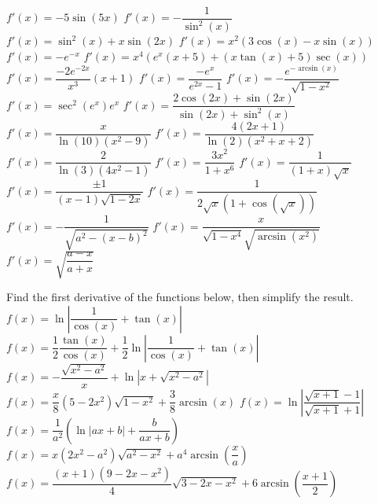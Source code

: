 \begin{Answer}\phantom{}
    \begin{multicols}{2}
	
			\ifcalculus\Question $f'(x) = -5\sin(5x)$
			\Question $f'(x) = -\dfrac{1}{\sin^2(x)}$\fi
			\Question $f'(x) =\sin^2 (x) + x\sin (2x) $
			\Question $f'(x) =x^2(3 \cos(x) - x \sin(x)) $
			\ifcalculus \Question $f'(x) = -e^{-x}$ \fi
	        \Question $f'(x)= x^4 \left(e^x \left(x+5 \right) + \left( x \tan(x) + 5 \right) \sec(x)  \right) $
        	\Question $f'(x)=\dfrac{-2e^{-2x}}{x^3}(x+1)$
            \Question $f'(x)=\dfrac{-e^{x}}{e^{2x}-1} $
        	\Question $f'(x) = -\dfrac{e^{- \arcsin (x)}}{\sqrt{1-x^2}}$
        	\Question $f'(x) = \sec^2 (e^x)e^x$
        	\ifcalculus \Question $f'(x) = \dfrac{2\cos(2x)+\sin(2x)}{\sin(2x) + \sin^2(x)}$ \fi
        	\Question $f'(x) = \dfrac{x}{\ln (10) \left(x^2-9\right)}$
        	\Question $f'(x) = \dfrac{4(2x+1)}{\ln (2) \left(x^2+x+2\right)}$
        	\Question $f'(x) = \dfrac{2}{\ln (3) \left(4x^2-1\right)}$
        	\ifcalculus \Question $f'(x) = \dfrac{3x^2}{1+x^6}$ 
	        \Question $f'(x) = \dfrac{1}{(1+x)\sqrt{x}}$\fi
			\Question $f'(x) =\dfrac{\pm 1}{(x-1)\sqrt{1-2x}}$
        	\Question $f'(x) = \dfrac{1}{2 \sqrt{x} \left( 1 + \cos \left(\sqrt{x}\right) \right)}$ 
	        \Question $f'(x) = -\dfrac{1}{\sqrt{a^2 - (x-b)^2}}$ 
        	\Question $f'(x) = \dfrac{x}{\sqrt{1 - x^4} \sqrt{\arcsin(x^2)}}$
        	\Question $f'(x) =\sqrt{\dfrac{a-x}{a+x}}$ 
	\EndCurrentQuestion
	\end{multicols}
\end{Answer}	
	
\begin{Exercise} Find the first derivative of the functions below, then simplify the result. 
	\Question[difficulty = 1] $f(x)=\ln \left| \dfrac{1}{\cos(x)} + \tan(x) \right|$ 
	\Question[difficulty = 1] $f(x)= \dfrac{1}{2} \dfrac{\tan(x)}{\cos(x)} + \dfrac{1}{2}  \ln \left| \dfrac{1}{\cos(x)} + \tan(x) \right|$ 
	\ifanalysis \Question[difficulty = 1] \fi \ifcalculus \Question[difficulty = 2] \fi $f(x)=- \dfrac{\sqrt{x^2-a^2}}{x} + \ln \left|x+ \sqrt{x^2-a^2} \right|  $	
	\Question[difficulty = 1] $f(x)= \dfrac{x}{8} \left(5-2x^2 \right) \sqrt{1-x^2} + \dfrac{3}{8} \arcsin (x) $
	\Question[difficulty = 2] $f(x)= \ln \left| \dfrac{\sqrt{x+1}-1}{\sqrt{x+1}+1} \right|  $	
	\Question[difficulty = 1] $f(x)= \dfrac{1}{a^2} \left( \ln \left| ax+b \right| + \dfrac{b}{ax+b} \right) $
	\Question[difficulty = 1]  $f(x)= x \left( 2x^2 - a^2 \right) \sqrt{a^2 - x^2} + a^4 \arcsin \left( \dfrac{x}{a} \right)$
	\Question[difficulty = 2]  $f(x)= \dfrac{(x+1) \left( 9- 2x - x^2\right)}{4} \sqrt{3- 2x - x^2} + 6 \arcsin \left( \dfrac{x+1}{2} \right)$

\end{Exercise}

